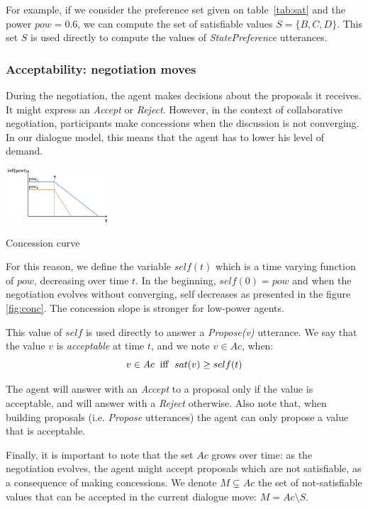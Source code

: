 \documentclass[sigconf]{aamas}  %
\begin{document}
	For example, if we consider the preference set given on table~\ref{tab:sat} and the power $pow=0.6$, we can compute the set of satisfiable values $S = \{B, C, D\}$. This set $S$ is used directly to compute the values of \emph{StatePreference} utterances.
	
	\subsubsection{Acceptability: negotiation moves}
	During the negotiation, the agent makes decisions about the proposals it receives. It might express an \emph{Accept} or \emph{Reject}. However, in the context of collaborative negotiation, participants make concessions when the discussion is not converging. In our dialogue model, this means that the agent has to lower his level of demand.
	
		\begin{floatingfigure}[r]{1.5in}
			\includegraphics[width=1.5in]{figs/sv3.png}
			\caption{\label{fig:conc}Concession curve}
		\end{floatingfigure} 
		
	For this reason, we define the variable $self(t)$ which is a time varying function of $pow$, decreasing over time $t$. In the beginning, $self(0) = pow$ and when the negotiation evolves without converging, self decreases as presented in the figure \ref{fig:conc}. The concession slope is stronger for low-power agents.
	
	This value of $self$ is used directly to answer a \emph{Propose(v)} utterance. We say that the value $v$ is \emph{acceptable} at time $t$, and we note $v \in Ac$, when:
	\begin{equation}
	v\in Ac\hspace{2mm}\mathrm{iff}\hspace{2mm}sat(v) \geq self(t)
	\end{equation}
	
	The agent will answer with an \emph{Accept} to a proposal only if the value is acceptable, and will answer with a \emph{Reject} otherwise. Also note that, when building proposals (i.e. \emph{Propose} utterances) the agent can only propose a value that is acceptable.
	
	Finally, it is important to note that the set $Ac$ grows over time: as the negotiation evolves, the agent might accept proposals which are not satisfiable, as a consequence of making concessions. We denote $M\varsubsetneq Ac$ the set of not-satisfiable values that can be accepted in the current dialogue move: $M = Ac\setminus S$.
	
\end{document}
